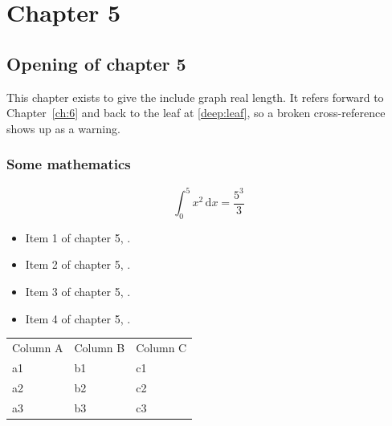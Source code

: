\chapter{Chapter 5}
\label{ch:5}
\section{Opening of chapter 5}
This chapter exists to give the include graph real length. It refers
forward to Chapter~\ref{ch:6} and back to the leaf
at \ref{deep:leaf}, so a broken cross-reference shows up as a warning.

\subsection{Some mathematics}
\begin{equation}
  \int_0^{5} x^{2} \, \mathrm{d}x = \frac{5^{3}}{3}
\end{equation}

\begin{itemize}
  \item Item 1 of chapter 5, .
  \item Item 2 of chapter 5, .
  \item Item 3 of chapter 5, .
  \item Item 4 of chapter 5, .
\end{itemize}

\begin{tabular}{lll}
  Column A & Column B & Column C \\
  a1 & b1 & c1 \\
  a2 & b2 & c2 \\
  a3 & b3 & c3 \\
\end{tabular}

